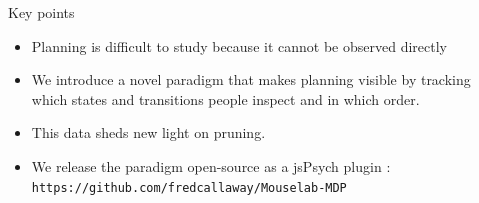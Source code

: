 \documentclass[final]{beamer}
\newlength{\sepwid}
\newlength{\onecolwid}
\begin{document}
\begin{frame}[t, fragile] %
\begin{columns}[t] %
\begin{column}{\sepwid}\end{column} %


\begin{column}{\onecolwid} %
  \begin{block}{Key points}\label{contribution}
    \begin{itemize}
      \item Planning is difficult to study because it cannot be observed directly%
      \item We introduce a novel paradigm that makes planning visible by tracking which states and transitions people inspect and in which order.
      \item This data sheds new light on pruning.
      \item We release the paradigm open-source as a jsPsych plugin \cite{DeLeeuw2015}: \texttt{https://github.com/fredcallaway/Mouselab-MDP}
    \end{itemize}
  \end{block}



\end{column}
\end{columns}
\end{frame}
\end{document}
